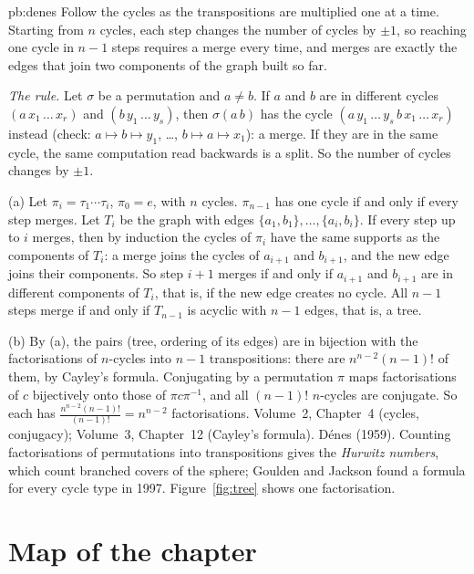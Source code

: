 \begin{solution}{pb:denes}
\idea Follow the cycles as the transpositions are multiplied one at a time. Starting from $n$ cycles, each step changes the number
of cycles by $\pm1$, so reaching one cycle in $n-1$ steps requires a merge every time, and merges are exactly the edges that join two
components of the graph built so far.

\writeup \emph{The rule.} Let $\sigma$ be a permutation and $a\ne b$. If $a$ and $b$ are in different cycles
$(a\,x_1\,\dots\,x_r)$ and $(b\,y_1\,\dots\,y_s)$, then $\sigma(a\,b)$ has the cycle $(a\,y_1\,\dots\,y_s\,b\,x_1\,\dots\,x_r)$ instead (check:
$a\mapsto b\mapsto y_1$, \dots, $b\mapsto a\mapsto x_1$): a merge. If they are in the same cycle, the same computation read backwards is a
split. So the number of cycles changes by $\pm1$.

(a) Let $\pi_i=\tau_1\cdots\tau_i$, $\pi_0=e$, with $n$ cycles. $\pi_{n-1}$ has one cycle if and only if every step merges. Let $T_i$ be
the graph with edges $\{a_1,b_1\},\dots,\{a_i,b_i\}$. If every step up to $i$ merges, then by induction the cycles of $\pi_i$ have the
same supports as the components of $T_i$: a merge joins the cycles of $a_{i+1}$ and $b_{i+1}$, and the new edge joins their
components. So step $i+1$ merges if and only if $a_{i+1}$ and $b_{i+1}$ are in different components of $T_i$, that is, if the new
edge creates no cycle. All $n-1$ steps merge if and only if $T_{n-1}$ is acyclic with $n-1$ edges, that is, a tree.

(b) By (a), the pairs (tree, ordering of its edges) are in bijection with the factorisations of $n$-cycles into $n-1$
transpositions: there are $n^{n-2}(n-1)!$ of them, by Cayley's formula. Conjugating by a permutation $\pi$ maps factorisations of
$c$ bijectively onto those of $\pi c\pi^{-1}$, and all $(n-1)!$ $n$-cycles are conjugate. So each has $\frac{n^{n-2}(n-1)!}{(n-1)!}=n^{n-2}$
factorisations.
\tools Volume~2, Chapter~4 (cycles, conjugacy); Volume~3, Chapter~12 (Cayley's formula).
\leads Dénes (1959). Counting factorisations of permutations into transpositions gives the \emph{Hurwitz numbers}, which count
branched covers of the sphere; Goulden and Jackson found a formula for every cycle type in 1997. Figure~\ref{fig:tree} shows one
factorisation.
\end{solution}

\section*{Map of the chapter}

